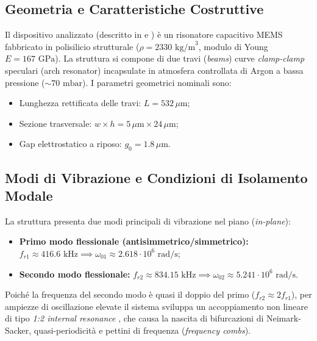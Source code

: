 \documentclass[11pt,a4paper]{article}
\begin{document}
\subsection{Geometria e Caratteristiche Costruttive}
Il dispositivo analizzato (descritto in \cite{Frangi2023} e \cite{UniBS2026}) è un risonatore capacitivo MEMS fabbricato in polisilicio strutturale ($\rho = 2330\text{ kg/m}^3$, modulo di Young $E = 167\text{ GPa}$). La struttura si compone di due travi (\emph{beams}) curve \emph{clamp-clamp} speculari (arch resonator) incapsulate in atmosfera controllata di Argon a bassa pressione ($\sim 70\text{ mbar}$).
I parametri geometrici nominali sono:
\begin{itemize}
    \item Lunghezza rettificata delle travi: $L = 532\,\mu\text{m}$;
    \item Sezione trasversale: $w \times h = 5\,\mu\text{m} \times 24\,\mu\text{m}$;
    \item Gap elettrostatico a riposo: $g_0 = 1.8\,\mu\text{m}$.
\end{itemize}

\subsection{Modi di Vibrazione e Condizioni di Isolamento Modale}
La struttura presenta due modi principali di vibrazione nel piano (\emph{in-plane}):
\begin{itemize}
    \item \textbf{Primo modo flessionale (antisimmetrico/simmetrico):} $f_{r1} \approx 416.6\text{ kHz} \implies \omega_{01} \approx 2.618 \cdot 10^6\text{ rad/s}$;
    \item \textbf{Secondo modo flessionale:} $f_{r2} \approx 834.15\text{ kHz} \implies \omega_{02} \approx 5.241 \cdot 10^6\text{ rad/s}$.
\end{itemize}

Poiché la frequenza del secondo modo è quasi il doppio del primo ($f_{r2} \approx 2 f_{r1}$), per ampiezze di oscillazione elevate il sistema sviluppa un accoppiamento non lineare di tipo \emph{1:2 internal resonance} \cite{Frangi2023, Nastro2026}, che causa la nascita di bifurcazioni di Neimark-Sacker, quasi-periodicità e pettini di frequenza (\emph{frequency combs}).
\end{document}
